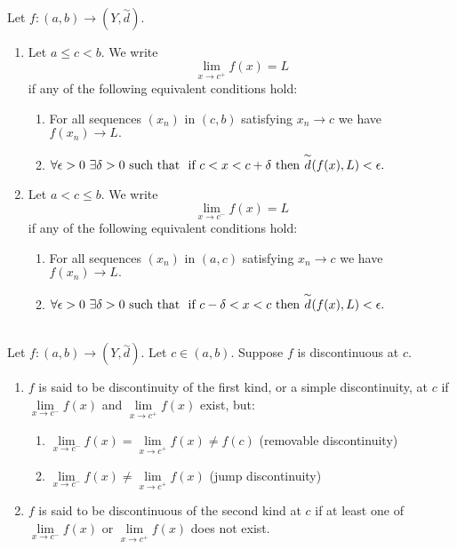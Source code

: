 \begin{definition} \leavevmode \\
    Let $f: (a,b) \to (Y, \overset{\sim}{d})$.
    \begin{enumerate}[$(i)$]
        \item Let $a \leq c < b.$ We write 
        $$\lim \limits_{x \to c^+} f(x) = L$$
        if any of the following equivalent conditions hold:
        \begin{enumerate}
            \item For all sequences $(x_n)$ in $(c,b)$ satisfying $x_n \to c$ we have $f(x_n) \to L.$
            \item $\forall \epsilon > 0 ~\exists \delta > 0 \text{ such that } \text{ if $c < x < c + \delta$ then $\overset{\sim}{d}(f(x), L) < \epsilon$.}$
        \end{enumerate}
        \item Let $a < c \leq b.$ We write 
        $$\lim \limits_{x \to c^-} f(x) = L$$
        if any of the following equivalent conditions hold:
        \begin{enumerate}
            \item For all sequences $(x_n)$ in $(a,c)$ satisfying $x_n \to c$ we have $f(x_n) \to L.$
            \item $\forall \epsilon > 0 ~\exists \delta > 0 \text{ such that } \text{ if $c - \delta < x < c$ then $\overset{\sim}{d}(f(x), L) < \epsilon$.}$
        \end{enumerate}
    \end{enumerate}
\end{definition}

\begin{definition} \leavevmode \\
    Let $f:(a,b) \to (Y, \overset{\sim}{d}).$ Let $c\in (a,b)$. Suppose $f$ is discontinuous at $c$.
    \begin{enumerate}[$(i)$]
        \item $f$ is said to be discontinuity of the first kind, or a simple discontinuity, at $c$ if $\lim \limits_{x\to c^-}f(x)$ and $\lim \limits_{x\to c^+}f(x)$ exist, but: 
        \begin{enumerate}
            \item $\lim \limits_{x \to c^-}f(x) = \lim \limits_{x \to c^+}f(x) \not = f(c)$ (removable discontinuity)
            \item $\lim \limits_{x \to c^-}f(x) \not = \lim \limits_{x \to c^+}f(x)$ (jump discontinuity)
        \end{enumerate}
        \item $f$ is said to be discontinuous of the second kind at $c$ if at least one of $\lim \limits_{x \to c^-}f(x)$ or $\lim \limits_{x\to c^+}f(x)$ does not exist.
    \end{enumerate}
\end{definition}


